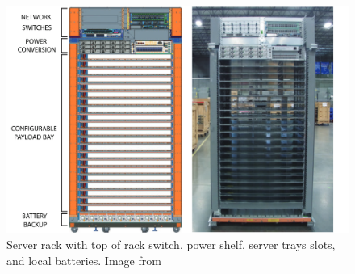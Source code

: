 \begin{figure} [!h]
\centering
\includegraphics[scale=.5]{methodology/images/goog_rack.png}
\caption[Example Server Rack]{Server rack with top of rack switch, power shelf, server trays slots, and local batteries. Image from \cite{barroso18}}
\label{goog_rack}
\end{figure}